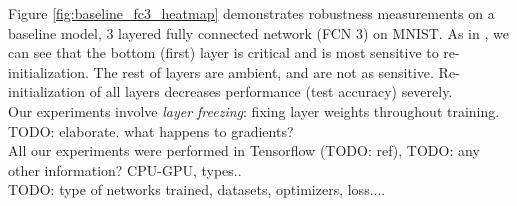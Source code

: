 \documentclass{article}
\begin{document}
Figure \ref{fig:baseline_fc3_heatmap} demonstrates robustness measurements on a baseline model, 3 layered fully connected network (FCN 3) on MNIST. As in \cite{allLayers}, we can see that the bottom (first) layer is critical and is most sensitive to  re-initialization. The rest of layers are ambient, and are not as sensitive. Re-initialization of all layers decreases performance (test accuracy) severely.\\
Our experiments involve \emph{layer freezing}: fixing layer weights throughout training. TODO: elaborate. what happens to gradients?\\
All our experiments were performed in Tensorflow (TODO: ref), TODO: any other information? CPU-GPU, types..\\
TODO: type of networks trained, datasets, optimizers, loss....
\end{document}
